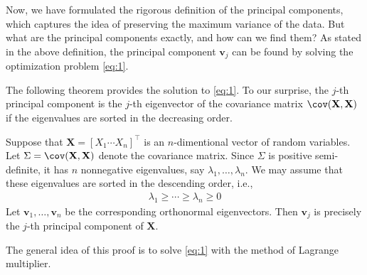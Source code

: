 \documentclass[color=blue, thmcnt=section, 12pt]{elegantbook}
\begin{document}

\par Now, we have formulated the rigorous definition of the principal components, which captures the idea of preserving the maximum variance of the data. But what are the principal components exactly, and how can we find them? As stated in the above definition, the principal component $\mathbf{v}_j$ can be found by solving the optimization problem \eqref{eq:1}.

\par The following theorem provides the solution to \eqref{eq:1}. To our surprise, the $j$-th principal component is the $j$-th eigenvector of the covariance matrix $\cov(\mathbf{X}, \mathbf{X})$ if the eigenvalues are sorted in the decreasing order.


\begin{theorem}
    Suppose that $\mathbf{X} = \left[X_1 \cdots X_n\right]^\top$ is an $n$-dimentional vector of random variables. Let $\Sigma = \cov(\mathbf{X}, \mathbf{X})$ denote the covariance matrix. Since $\Sigma$ is positive semi-definite, it has $n$ nonnegative eigenvalues, say $\lambda_1, \ldots, \lambda_n$. We may assume that these eigenvalues are sorted in the descending order, i.e., 
    \begin{align*}
        \lambda_1 \geq \cdots \geq \lambda_n \geq 0
    \end{align*}
    Let $\mathbf{v}_1, \ldots, \mathbf{v}_n$ be the corresponding orthonormal eigenvectors. Then $\mathbf{v}_j$ is precisely the $j$-th principal component of $\mathbf{X}$.
\end{theorem}

\par The general idea of this proof is to solve \eqref{eq:1} with the method of Lagrange multiplier.
\end{document}
